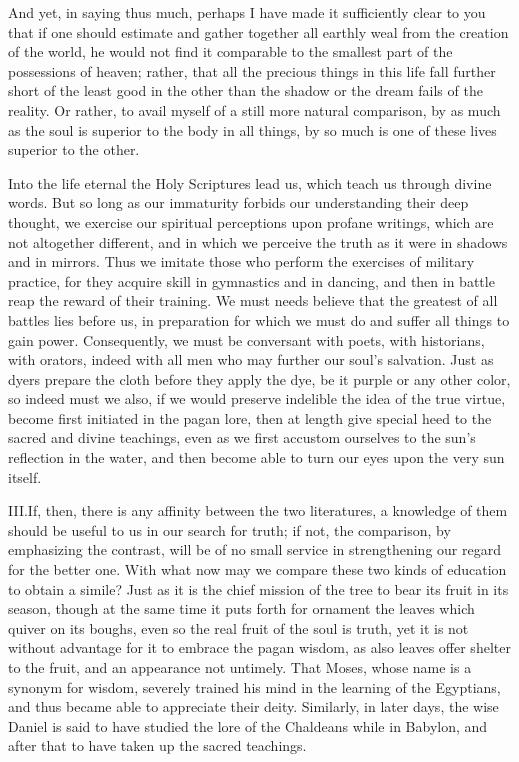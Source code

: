 \documentclass[a4paper]{article}
\begin{document}
And yet, in saying thus much, perhaps I have made it sufficiently clear to you that if one should estimate and gather together all earthly weal from the creation of the world, he would not find it comparable to the smallest part of the possessions of heaven; rather, that all the precious things in this life fall further short of the least good in the other than the shadow or the dream fails of the reality. Or rather, to avail myself of a still more natural comparison, by as much as the soul is superior to the body in all things, by so much is one of these lives superior to the other.

Into the life eternal the Holy Scriptures lead us, which teach us through divine words. But so long as our immaturity forbids our understanding their deep thought, we exercise our spiritual perceptions upon profane writings, which are not altogether different, and in which we perceive the truth as it were in shadows and in mirrors. Thus we imitate those who perform the exercises of military practice, for they acquire skill in gymnastics and in dancing, and then in battle reap the reward of their training. We must needs believe that the greatest of all battles lies before us, in preparation for which we must do and suffer all things to gain power. Consequently, we must be conversant with poets, with historians, with orators, indeed with all men who may further our soul's salvation. Just as dyers prepare the cloth before they apply the dye, be it purple or any other color, so indeed must we also, if we would preserve indelible the idea of the true virtue, become first initiated in the pagan lore, then at length give special heed to the sacred and divine teachings, even as we first accustom ourselves to the sun's reflection in the water, and then become able to turn our eyes upon the very sun itself.

\bigskip

\lettrine[lines=3, findent=3pt, nindent=0pt]{III.} If, then, there is any affinity between the two literatures, a knowledge of them should be useful to us in our search for truth; if not, the comparison, by emphasizing the contrast, will be of no small service in strengthening our regard for the better one. With what now may we compare these two kinds of education to obtain a simile? Just as it is the chief mission of the tree to bear its fruit in its season, though at the same time it puts forth for ornament the leaves which quiver on its boughs, even so the real fruit of the soul is truth, yet it is not without advantage for it to embrace the pagan wisdom, as also leaves offer shelter to the fruit, and an appearance not untimely. That Moses, whose name is a synonym for wisdom, severely trained his mind in the learning of the Egyptians, and thus became able to appreciate their deity. Similarly, in later days, the wise Daniel is said to have studied the lore of the Chaldeans while in Babylon, and after that to have taken up the sacred teachings.
\end{document}
